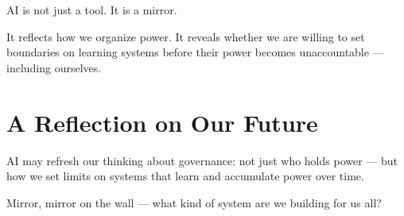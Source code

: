 \documentclass{article}
\begin{document}
AI is not just a tool.
It is a mirror.

It reflects how we organize power.
It reveals whether we are willing to set boundaries on learning systems before their power becomes unaccountable — including ourselves.

\section*{A Reflection on Our Future}

AI may refresh our thinking about governance: not just who holds power — but how we set limits on systems that learn and accumulate power over time.

Mirror, mirror on the wall — what kind of system are we building for us all?
\end{document}
